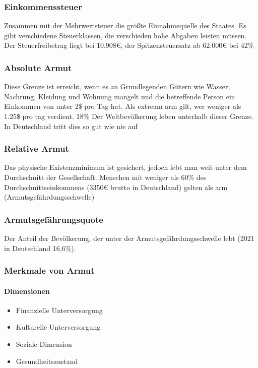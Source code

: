 \documentclass{article}
\begin{document}
	\subsubsection{Einkommenssteuer}
	Zusammen mit der Mehrwertsteuer die größte Einnahmequelle des Staates. Es gibt verschiedene Steuerklassen, die verschieden hohe Abgaben leisten müssen. Der Steuerfreibetrag liegt bei 10.908€, der Spitzensteuersatz ab 62.000€ bei 42\%

	\subsubsection{Absolute Armut}
	Diese Grenze ist erreicht, wenn es an Grundlegenden Gütern wie Wasser, Nachrung, Kleidung und Wohnung mangelt und die betreffende Person ein Einkommen von unter 2\$ pro Tag hat. Als extream arm gilt, wer weniger als 1.25\$ pro tag verdient. 18\% Der Weltbevölkerung leben unterhalb dieser Grenze. In Deutschland tritt dies so gut wie nie auf

	\subsubsection{Relative Armut}
	Das physische Existenzminimum ist gesichert, jedoch lebt man weit unter dem Durchschnitt der Gesellschaft. Menschen mit weniger als 60\% des Durchschnittseinkommens (3350€ brutto in Deutschland) gelten als arm (Armutsgefährdungsschwelle)

	\subsubsection{Armutsgefährungsquote}
	Der Anteil der Bevölkerung, der unter der Armutsgefährdungsschwelle lebt (2021 in Deutschland 16,6\%).

	\subsubsection{Merkmale von Armut}
	\paragraph{Dimensionen}

	\begin{itemize}
		\item Finanzielle Unterversorgung
		\item Kulturelle Unterversorgung
		\item Soziale Dimension
		\item Gesundheitszustand
	\end{itemize}
\end{document}
